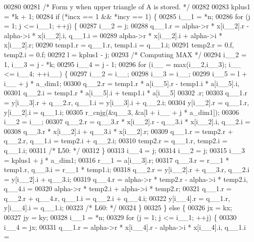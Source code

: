 \begin{DoxyCode}
00280 
00281 \textcolor{comment}{/*        Form  y  when upper triangle of A is stored. */}
00282 
00283     kplus1 = *k + 1;
00284     \textcolor{keywordflow}{if} (*incx == 1 && *incy == 1) \{
00285         i\_\_1 = *n;
00286         \textcolor{keywordflow}{for} (j = 1; j <= i\_\_1; ++j) \{
00287         i\_\_2 = j;
00288         q\_\_1.r = alpha->r * x[i\_\_2].r - alpha->i * x[i\_\_2].i, q\_\_1.i =
00289              alpha->r * x[i\_\_2].i + alpha->i * x[i\_\_2].r;
00290         temp1.r = q\_\_1.r, temp1.i = q\_\_1.i;
00291         temp2.r = 0.f, temp2.i = 0.f;
00292         l = kplus1 - j;
00293 \textcolor{comment}{/* Computing MAX */}
00294         i\_\_2 = 1, i\_\_3 = j - *k;
00295         i\_\_4 = j - 1;
00296         \textcolor{keywordflow}{for} (i\_\_ = max(i\_\_2,i\_\_3); i\_\_ <= i\_\_4; ++i\_\_) \{
00297             i\_\_2 = i\_\_;
00298             i\_\_3 = i\_\_;
00299             i\_\_5 = l + i\_\_ + j * a\_dim1;
00300             q\_\_2.r = temp1.r * a[i\_\_5].r - temp1.i * a[i\_\_5].i, 
00301                 q\_\_2.i = temp1.r * a[i\_\_5].i + temp1.i * a[i\_\_5]
00302                 .r;
00303             q\_\_1.r = y[i\_\_3].r + q\_\_2.r, q\_\_1.i = y[i\_\_3].i + q\_\_2.i;
00304             y[i\_\_2].r = q\_\_1.r, y[i\_\_2].i = q\_\_1.i;
00305             r\_cnjg(&q\_\_3, &a[l + i\_\_ + j * a\_dim1]);
00306             i\_\_2 = i\_\_;
00307             q\_\_2.r = q\_\_3.r * x[i\_\_2].r - q\_\_3.i * x[i\_\_2].i, q\_\_2.i =
00308                  q\_\_3.r * x[i\_\_2].i + q\_\_3.i * x[i\_\_2].r;
00309             q\_\_1.r = temp2.r + q\_\_2.r, q\_\_1.i = temp2.i + q\_\_2.i;
00310             temp2.r = q\_\_1.r, temp2.i = q\_\_1.i;
00311 \textcolor{comment}{/* L50: */}
00312         \}
00313         i\_\_4 = j;
00314         i\_\_2 = j;
00315         i\_\_3 = kplus1 + j * a\_dim1;
00316         r\_\_1 = a[i\_\_3].r;
00317         q\_\_3.r = r\_\_1 * temp1.r, q\_\_3.i = r\_\_1 * temp1.i;
00318         q\_\_2.r = y[i\_\_2].r + q\_\_3.r, q\_\_2.i = y[i\_\_2].i + q\_\_3.i;
00319         q\_\_4.r = alpha->r * temp2.r - alpha->i * temp2.i, q\_\_4.i = 
00320             alpha->r * temp2.i + alpha->i * temp2.r;
00321         q\_\_1.r = q\_\_2.r + q\_\_4.r, q\_\_1.i = q\_\_2.i + q\_\_4.i;
00322         y[i\_\_4].r = q\_\_1.r, y[i\_\_4].i = q\_\_1.i;
00323 \textcolor{comment}{/* L60: */}
00324         \}
00325     \} \textcolor{keywordflow}{else} \{
00326         jx = kx;
00327         jy = ky;
00328         i\_\_1 = *n;
00329         \textcolor{keywordflow}{for} (j = 1; j <= i\_\_1; ++j) \{
00330         i\_\_4 = jx;
00331         q\_\_1.r = alpha->r * x[i\_\_4].r - alpha->i * x[i\_\_4].i, q\_\_1.i =

\end{DoxyCode}
